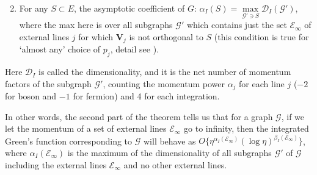 \documentclass{scrartcl}
\begin{document}
\begin{enumerate}
\setcounter{enumi}{1}
    \item For any $S \subset E$, the asymptotic coefficient of $G$: $\alpha_I(S)=\max\limits_{\mathcal{G'}\ni S} \mathcal{D}_I(\mathcal{G'})$, where the max here is over all subgraphs $\mathcal{G'}$ which contains just the set $\mathcal{E}_\infty$ of external lines $j$ for which $\mathbf{V}_j$ is not orthogonal to $S$ (this condition is true for `almost any' choice of $p_j$, detail see \cite[\S V]{weinberg}). 
\end{enumerate}
Here $\mathcal{D}_I$ is called the dimensionality, and it is the net number of momentum factors of the subgraph $\mathcal{G'}$, counting the momentum power $\alpha_j$ for each line $j$ ($-2$ for boson and $-1$ for fermion) and 4 for each integration. 

In other words, the second part of the theorem tells us that for a graph $\mathcal{G}$, if we let the momentum of a set of external lines $\mathcal{E}_\infty$ go to infinity, then the integrated Green's function corresponding to $\mathcal{G}$ will behave as $O\{\eta^{\alpha_I(\mathcal{E}_\infty)}(\log \eta)^{\beta_I(\mathcal{E}_\infty)}\}$, where $\alpha_I(\mathcal{E}_\infty)$ is the maximum of the dimensionality of all subgraphs $\mathcal{G'}$ of $\mathcal{G}$ including the external lines $\mathcal{E}_\infty$ and no other external lines.
\end{document}
